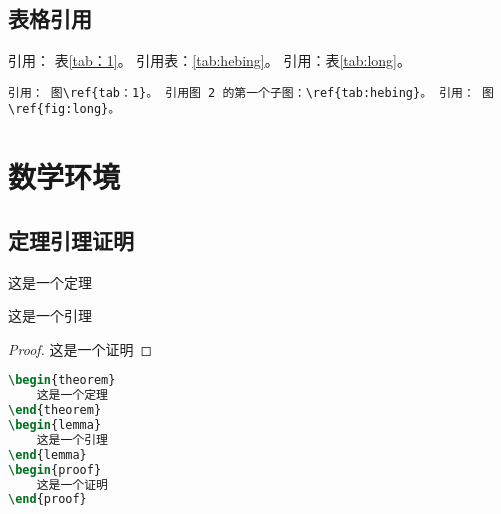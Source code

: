 \subsection{表格引用}
引用： 表\ref{tab：1}。 引用表：\ref{tab:hebing}。 引用：表\ref{tab:long}。
\begin{lstlisting}
引用： 图\ref{tab：1}。 引用图 2 的第一个子图：\ref{tab:hebing}。 引用： 图 \ref{fig:long}。
\end{lstlisting}

\section{数学环境}
\subsection{定理引理证明}
\begin{theorem}
这是一个定理
\end{theorem}
\begin{lemma}
这是一个引理
\end{lemma}
\begin{proof}
这是一个证明
\end{proof}
\begin{lstlisting}[language=TeX]
\begin{theorem}
	这是一个定理
\end{theorem}
\begin{lemma}
	这是一个引理
\end{lemma}
\begin{proof}
	这是一个证明
\end{proof}
\end{lstlisting}

